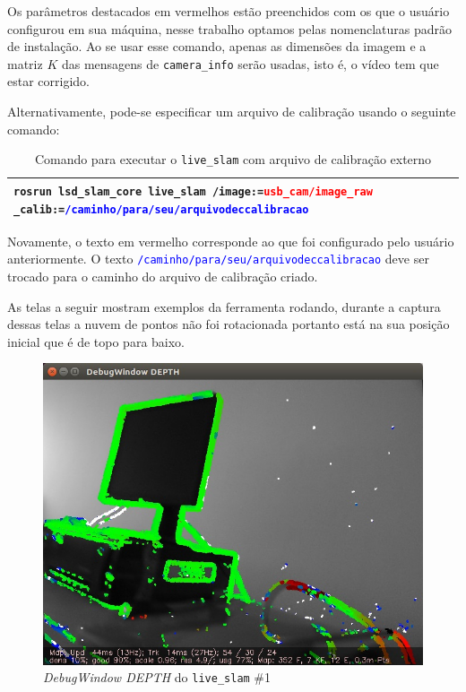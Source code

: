 Os parâmetros destacados em vermelhos estão preenchidos com os que o usuário configurou em sua máquina, nesse trabalho optamos pelas nomenclaturas padrão de instalação. Ao se usar esse comando, apenas as dimensões da imagem e a matriz $K$ das mensagens de \texttt{camera\_info} serão usadas, isto é, o vídeo tem que estar corrigido.

Alternativamente, pode-se especificar um arquivo de calibração usando o seguinte comando:

\begin{table}[H]\label{tb:15}
\begin{tabular}{| p{\textwidth}|}
\hline
\texttt{rosrun lsd\_slam\_core live\_slam /image:=\textcolor{red}{usb\_cam/image\_raw} \_calib:=\textcolor{blue}{/caminho/para/seu/arquivodeccalibracao}}\\
\hline
\end{tabular}
\caption{Comando para executar o \texttt{live\_slam} com arquivo de calibração externo}
\end{table}

Novamente, o texto em vermelho corresponde ao que foi configurado pelo usuário anteriormente. O texto \texttt{\textcolor{blue}{/caminho/para/seu/arquivodeccalibracao}} deve ser trocado para o caminho do arquivo de calibração criado.

As telas a seguir mostram exemplos da ferramenta rodando, durante a captura dessas telas a nuvem de pontos não foi rotacionada portanto está na sua posição inicial que é de topo para baixo. 

\begin{figure}[H]
	\centering
		\includegraphics[width= \textwidth]{Imagens/figura3-20.jpg}
	\caption{\textit{DebugWindow DEPTH} do \texttt{live\_slam} \#1}
	\label{fig3:20}
\end{figure}

